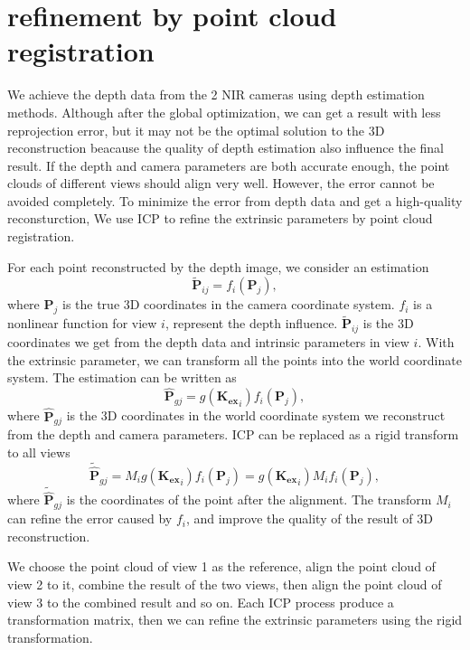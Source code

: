 \documentclass{article}
\begin{document}
\section{refinement by point cloud registration}

We achieve the depth data from the 2 NIR cameras using depth estimation methods. Although after the global optimization, we can get a result with less reprojection error, but it may not be the optimal solution to the 3D reconstruction beacause the quality of depth estimation also influence the final result. If the depth and camera parameters are both accurate enough, the point clouds of different views should align very well. However, the error cannot be avoided completely. To minimize the error from depth data and get a high-quality reconsturction, We use ICP to refine the extrinsic parameters by point cloud registration.

For each point reconstructed by the depth image, we consider an estimation
\begin{equation}
\mathbf{\tilde{P}}_{ij}=f_{i}(\mathbf{P}_{j}),
\end{equation}
where $\mathbf{P}_{j}$ is the true 3D coordinates in the camera coordinate system. $f_{i}$ is a nonlinear function for view $i$, represent the depth influence. $\mathbf{\tilde{P}}_{ij}$ is the 3D coordinates we get from the depth data and intrinsic parameters in view $i$. With the extrinsic parameter, we can transform all the points into the world coordinate system. The estimation can be written as
\begin{equation}
\mathbf{\hat{P}}_{gj}=g(\mathbf{K_{ex}}_{i})f_{i}(\mathbf{P}_{j}),
\end{equation}
where $\mathbf{\hat{P}}_{gj}$ is the 3D coordinates in the world coordinate system we reconstruct from the depth and camera parameters. ICP can be replaced as a rigid transform to all views
\begin{equation}
\mathbf{\tilde{\hat{P}}}_{gj}=M_{i}g(\mathbf{K_{ex}}_{i})f_{i}(\mathbf{P}_{j})=g(\mathbf{K_{ex}}_{i})M_{i}f_{i}(\mathbf{P}_{j}),
\end{equation}
where $\mathbf{\tilde{\hat{P}}}_{gj}$ is the coordinates of the point after the alignment. The transform $M_{i}$ can refine the error caused by $f_{i}$, and improve the quality of the result of 3D reconstruction.

We choose the point cloud of view 1 as the reference, align the point cloud of view 2 to it, combine the result of the two views, then align the point cloud of view 3 to the combined result and so on. Each ICP process produce a transformation matrix, then we can refine the extrinsic parameters using the rigid transformation.
\end{document}

